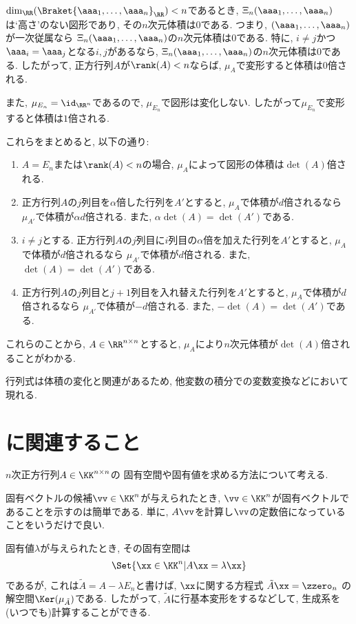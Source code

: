 $\dim_\RR(\Braket{\aaa_1,\ldots,\aaa_n}_\RR)<n$であるとき,
$\Xi_n(\aaa_1,\ldots,\aaa_n)$は`高さ'のない図形であり,
その$n$次元体積は$0$である.
つまり, $(\aaa_1,\ldots,\aaa_n)$が一次従属なら
$\Xi_n(\aaa_1,\ldots,\aaa_n)$の$n$次元体積は$0$である.
特に, $i\neq j$かつ$\aaa_i=\aaa_j$となる$i,j$があるなら,
$\Xi_n(\aaa_1,\ldots,\aaa_n)$の$n$次元体積は$0$である.
したがって,
正方行列$A$が$\rank(A)<n$ならば,
$\mu_{A}$で変形すると体積は$0$倍される.

また, $\mu_{E_n}=\id_{\RR^n}$であるので,
$\mu_{E_n}$で図形は変化しない.
したがって$\mu_{E_n}$で変形すると体積は$1$倍される.

これらをまとめると, 以下の通り:
\begin{enumerate}
\item
  $A=E_n$または$\rank(A)<n$の場合,
  $\mu_A$によって図形の体積は$\det(A)$倍される.
\item
  正方行列$A$の$j$列目を$\alpha$倍した行列を$A'$とすると,
  $\mu_{A}$で体積が$d$倍されるなら
  $\mu_{A'}$で体積が$\alpha d$倍される.
  また, $\alpha \det(A)=\det(A')$である.
\item
  $i\neq j$とする.
  正方行列$A$の$j$列目に$i$列目の$\alpha$倍を加えた行列を$A'$とすると,
  $\mu_{A}$で体積が$d$倍されるなら
  $\mu_{A'}$で体積が$d$倍される.
  また, $\det(A)=\det(A')$である.
\item
  正方行列$A$の$j$列目と$j+1$列目を入れ替えた行列を$A'$とすると,
  $\mu_{A}$で体積が$d$倍されるなら
  $\mu_{A'}$で体積が$-d$倍される.
  また, $-\det(A)=\det(A')$である.
\end{enumerate}
これらのことから,
$A\in\RR^{n\times n}$とすると,
$\mu_{A}$により$n$次元体積が$\det(A)$倍されることがわかる.


\begin{remark}
  行列式は体積の変化と関連があるため,
  他変数の積分での変数変換などにおいて現れる.
\end{remark}


\section{に関連すること}
$n$次正方行列$A\in\KK^{n\times n}$の
固有空間や固有値を求める方法について考える.

固有ベクトルの候補$\vv\in \KK^n$が与えられたとき,
$\vv\in \KK^n$が固有ベクトルであることを示すのは簡単である.
単に, $A\vv$を計算し$\vv$の定数倍になっていることをいうだけで良い.


固有値$\lambda$が与えられたとき,
その固有空間は
\begin{align*}
  \Set{\xx\in \KK^n|A\xx=\lambda\xx}
\end{align*}
であるが, これは$\tilde A=A-\lambda E_n$と書けば,
$\xx$に関する方程式
$\tilde A \xx=\zzero_n$
の解空間$\Ker(\mu_{\tilde A})$である.
したがって, $\tilde A$に行基本変形をするなどして,
生成系を(いつでも)計算することができる.

